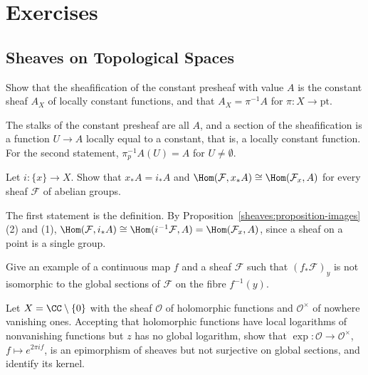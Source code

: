 \section{Exercises}\label{sheaves:section-exercises}

\subsection{Sheaves on Topological Spaces}\label{sheaves:subsection-exercises-sheaves-on-topological-spaces}

\begin{exercise}\label{sheaves:exercise-constant-sheaf}
Show that the sheafification of the constant presheaf with value $A$ is the constant sheaf $A_X$ of locally constant functions, and that $A_X = \pi^{-1}A$ for
$\pi \colon X \to \mathrm{pt}$.
\end{exercise}

\begin{solution}
The stalks of the constant presheaf are all $A$, and a section of the sheafification is a function $U \to A$ locally equal to a constant, that is, a locally constant function.
For the second statement, $\pi_p^{-1}A(U) = A$ for $U \neq \emptyset$.
\end{solution}

\begin{exercise}\label{sheaves:exercise-skyscraper-adjunction}
Let $i \colon \{x\} \to X$. Show that $x_*A = i_*A$ and $\Hom(\mathcal{F}, x_*A) \cong \Hom(\mathcal{F}_x, A)$ for every sheaf $\mathcal{F}$ of abelian groups.
\end{exercise}

\begin{solution}
The first statement is the definition. By Proposition~\ref{sheaves:proposition-images}(2) and (1),
$\Hom(\mathcal{F}, i_*A) \cong \Hom(i^{-1}\mathcal{F}, A) = \Hom(\mathcal{F}_x, A)$, since a sheaf on a point is a single group.
\end{solution}

\begin{exercise}\label{sheaves:exercise-direct-image-stalk}
Give an example of a continuous map $f$ and a sheaf $\mathcal{F}$ such that $(f_*\mathcal{F})_y$ is not isomorphic to the global sections of $\mathcal{F}$ on the fibre $f^{-1}(y)$.
\end{exercise}

\begin{exercise}\label{sheaves:exercise-epi-not-surjective}
Let $X = \CC \setminus \{0\}$ with the sheaf $\mathcal{O}$ of holomorphic functions and $\mathcal{O}^\times$ of nowhere vanishing ones. Accepting that holomorphic functions have local
logarithms of nonvanishing functions but $z$ has no global logarithm, show that $\exp \colon \mathcal{O} \to \mathcal{O}^\times$, $f \mapsto e^{2\pi i f}$, is an epimorphism of sheaves but not
surjective on global sections, and identify its kernel.
\end{exercise}

